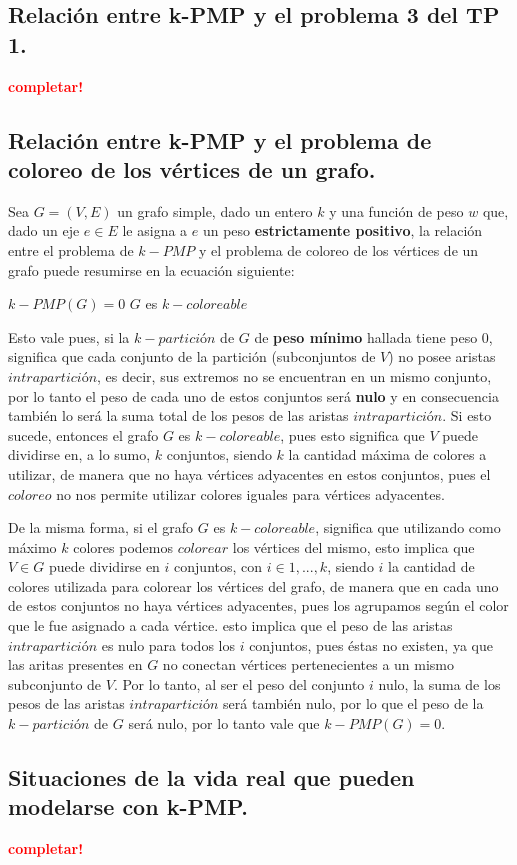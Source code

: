 \subsection{Relación entre k-PMP y el problema 3 del TP 1.}
\vspace*{0.3cm}
\textcolor{red}{\textbf{completar!}}



\newpage
\subsection{Relación entre k-PMP y el problema de coloreo de los vértices de
            un grafo.}
\vspace*{0.3cm}

Sea $G = (V, E)$ un grafo simple, dado un entero $k$ y una función de peso $w$ 
que, dado un eje $e \in E$ le asigna a $e$ un peso \textbf{estrictamente positivo},
la relación entre el problema de $k-PMP$ y el problema de coloreo de los vértices 
de un grafo puede resumirse en la ecuación siguiente:

\begin{center}
  $k-PMP(G) = 0$ \iff $G$ es $k-coloreable$
\end{center}

Esto vale pues, si la $k-partición$ de $G$ de \textbf{peso mínimo} hallada 
tiene peso 0, significa que cada conjunto de la partición (subconjuntos de $V$) 
no posee aristas $intrapartición$, es decir, sus extremos no se encuentran en 
un mismo conjunto, por lo tanto el peso de cada uno de estos conjuntos será 
\textbf{nulo} y en consecuencia también lo será la suma total de los pesos de 
las aristas $intrapartición$. Si esto sucede, entonces el grafo $G$ es 
$k-coloreable$, pues esto significa que $V$ puede dividirse en, a lo sumo, $k$ 
conjuntos, siendo $k$ la cantidad máxima de colores a utilizar, de manera que no 
haya vértices adyacentes en estos conjuntos, pues el $coloreo$ no nos permite 
utilizar colores iguales para vértices adyacentes.

De la misma forma, si el grafo $G$ es $k-coloreable$, significa que utilizando 
como máximo $k$ colores podemos $colorear$ los vértices del mismo, esto implica 
que $V \in G$ puede dividirse en $i$ conjuntos, con $i \in {1,...,k}$, siendo $i$ 
la cantidad de colores utilizada para colorear los vértices del grafo, de manera 
que en cada uno de estos conjuntos no haya vértices adyacentes, pues los agrupamos 
según el color que le fue asignado a cada vértice. esto implica que el peso de 
las aristas $intrapartición$ es nulo para todos los $i$ conjuntos, pues éstas no 
existen, ya que las aritas presentes en $G$ no conectan vértices pertenecientes a 
un mismo subconjunto de $V$. Por lo tanto, al ser el peso del conjunto $i$ nulo, 
la suma de los pesos de las aristas $intrapartición$ será también nulo, por lo 
que el peso de la $k-partición$ de $G$ será nulo, por lo tanto vale que $k-PMP(G) = 0$.



\newpage
\subsection{Situaciones de la vida real que pueden modelarse con k-PMP.}
\vspace*{0.3cm}
\textcolor{red}{\textbf{completar!}}

